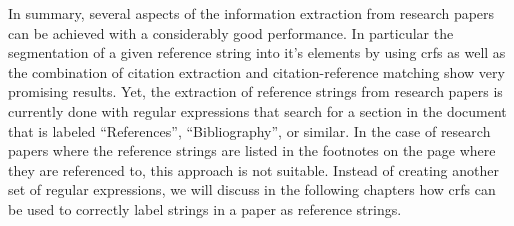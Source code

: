 In summary, several aspects of the information extraction from research papers can be achieved with a considerably good performance.
In particular the segmentation of a given reference string into it's elements by using \glspl{crf} \citep{peng2004accurate,councill2008parscit,groza2012reference} as well as the combination of citation extraction and citation-reference matching \citep{powley2007evidence} show very promising results.
Yet, the extraction of reference strings from research papers is currently done with regular expressions that search for a section in the document that is labeled ``References'', ``Bibliography'', or similar.
In the case of research papers where the reference strings are listed in the footnotes on the page where they are referenced to, this approach is not suitable.
Instead of creating another set of regular expressions, we will discuss in the following chapters how \glspl{crf} can be used to correctly label strings in a paper as reference strings.
